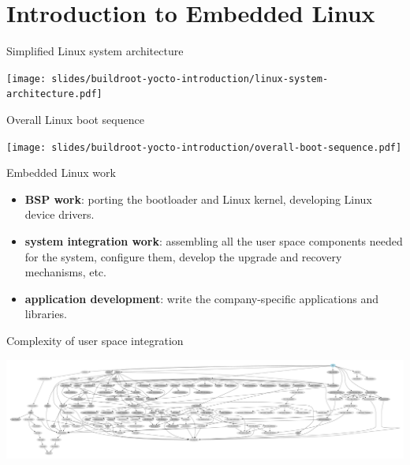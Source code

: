 \section{Introduction to Embedded Linux}

\begin{frame}{Simplified Linux system architecture}
  \begin{center}
    \texttt{[image: slides/buildroot-yocto-introduction/linux-system-architecture.pdf]}
  \end{center}
\end{frame}

\begin{frame}{Overall Linux boot sequence}
  \begin{center}
    \texttt{[image: slides/buildroot-yocto-introduction/overall-boot-sequence.pdf]}
  \end{center}
\end{frame}

\begin{frame}{Embedded Linux work}
  \begin{itemize}
  \item {\bf BSP work}: porting the bootloader and Linux kernel,
    developing Linux device drivers.
  \item {\bf system integration work}: assembling all the user space
    components needed for the system, configure them, develop the
    upgrade and recovery mechanisms, etc.
  \item {\bf application development}: write the company-specific
    applications and libraries.
  \end{itemize}
\end{frame}

\begin{frame}{Complexity of user space integration}
  \begin{center}
    \includegraphics[width=\textwidth]{slides/buildroot-yocto-introduction/graph-depends.pdf}
  \end{center}
\end{frame}

